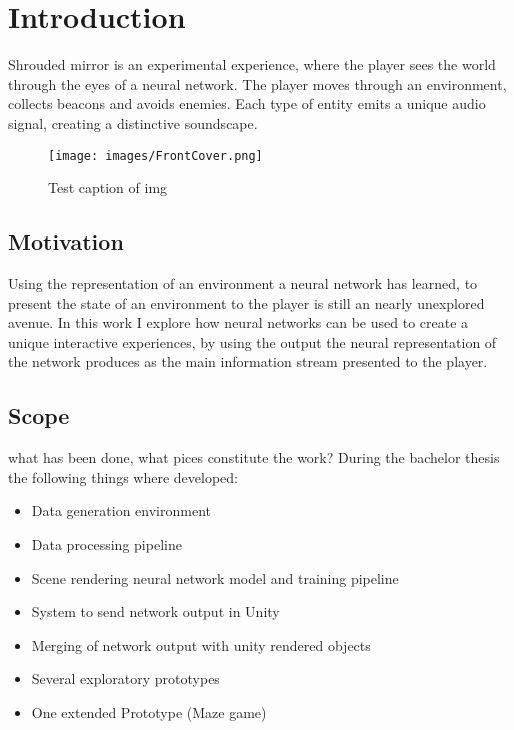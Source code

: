 \chapter{Introduction}
Shrouded mirror is an experimental experience, where the player sees the world through the eyes of a neural network. The player moves through an environment, collects beacons and avoids enemies. Each type of entity emits a unique audio signal, creating a distinctive soundscape.
\begin{figure}[hbt]
\centering
 {\caption{Test caption of img}
    }
{\texttt{[image: images/FrontCover.png]}}
\end{figure}

\section{Motivation}
Using the representation of an environment a neural network has learned, to present the state of an environment to the player is still an nearly unexplored avenue. 
In this work I explore how neural networks can be used to create a unique interactive experiences, by using the output the neural representation of the network produces as the main information stream presented to the player.

\section{Scope}
what has been done, what pices constitute the work?
During the bachelor thesis the following things where developed:

\begin{itemize}
\item{Data generation environment}
\item{Data processing pipeline}
\item{Scene rendering neural network model and training pipeline}
\item{System to send network output in Unity}
\item{Merging of network output with unity rendered objects}
\item{Several exploratory prototypes}
\item{One extended Prototype (Maze game)}
\end{itemize}